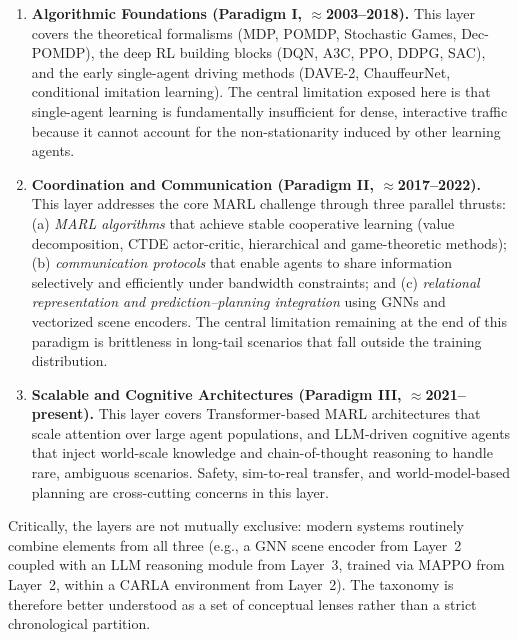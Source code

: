 \documentclass[12pt, a4paper]{article}
\begin{document}
\begin{enumerate}[leftmargin=*, label=\textbf{Layer \arabic*.}]
  \item \textbf{Algorithmic Foundations (Paradigm I, $\approx$2003--2018).}
        This layer covers the theoretical formalisms (MDP, POMDP, Stochastic
        Games, Dec-POMDP), the deep RL building blocks (DQN, A3C, PPO,
        DDPG, SAC), and the early single-agent driving methods (DAVE-2,
        ChauffeurNet, conditional imitation learning).  The central
        limitation exposed here is that single-agent learning is
        fundamentally insufficient for dense, interactive traffic because
        it cannot account for the non-stationarity induced by other
        learning agents.

  \item \textbf{Coordination and Communication (Paradigm II, $\approx$2017--2022).}
        This layer addresses the core MARL challenge through three parallel
        thrusts: (a) \emph{MARL algorithms} that achieve stable cooperative
        learning (value decomposition, CTDE actor-critic, hierarchical and
        game-theoretic methods); (b) \emph{communication protocols} that
        enable agents to share information selectively and efficiently
        under bandwidth constraints; and (c) \emph{relational representation
        and prediction--planning integration} using GNNs and vectorized
        scene encoders.  The central limitation remaining at the end of
        this paradigm is brittleness in long-tail scenarios that fall
        outside the training distribution.

  \item \textbf{Scalable and Cognitive Architectures (Paradigm III, $\approx$2021--present).}
        This layer covers Transformer-based MARL architectures that scale
        attention over large agent populations, and LLM-driven cognitive
        agents that inject world-scale knowledge and chain-of-thought
        reasoning to handle rare, ambiguous scenarios.  Safety, sim-to-real
        transfer, and world-model-based planning are cross-cutting concerns
        in this layer.
\end{enumerate}

Critically, the layers are not mutually exclusive: modern systems
routinely combine elements from all three (e.g., a GNN scene encoder
from Layer~2 coupled with an LLM reasoning module from Layer~3, trained
via MAPPO from Layer~2, within a CARLA environment from Layer~2).  The
taxonomy is therefore better understood as a set of conceptual lenses
rather than a strict chronological partition.
\end{document}
